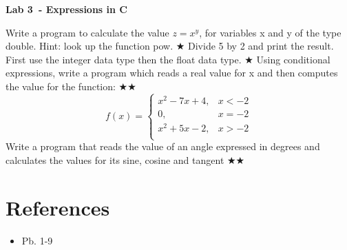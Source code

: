 \documentclass{exam}
\newcommand\labnr{3}
\newcommand\lab{Lab \labnr\ - Expressions in C}
\newcommand\lvlez{$\bigstar$}
\newcommand\lvlmed{\lvlez\lvlez}
\begin{document}
\begin{center}
    \vspace*{0cm}
    \bfseries\LARGE
    \lab
    \vspace*{1cm}
\end{center}


\begin{questions}   
   \question Write a program to calculate the value $z=x^{y}$, for variables x and y of the type double. 
   Hint: look up the function pow. \lvlez
   \question Divide 5 by 2 and print the result. First use the integer data type then the float data type. \lvlez
   \question Using conditional expressions, write a program which reads a real value for
x and then computes the
value for the function: \lvlmed
\[ 
f(x)= \left\{
\begin{array}{ll}
      x^2-7x+4, & x<-2 \\
      0, & x=-2 \\
      x^2+5x-2, & x>-2 \\
\end{array} 
\right. 
\]
   \question Write a program that reads the value of an angle expressed in degrees and calculates the values for
its sine, cosine and tangent \lvlmed

\end{questions}

\medskip
\section*{References}
\begin{itemize}
   \item Pb. 1-9 \cite{cplab02}
\end{itemize}
\printbibliography[heading=none]
\end{document}
